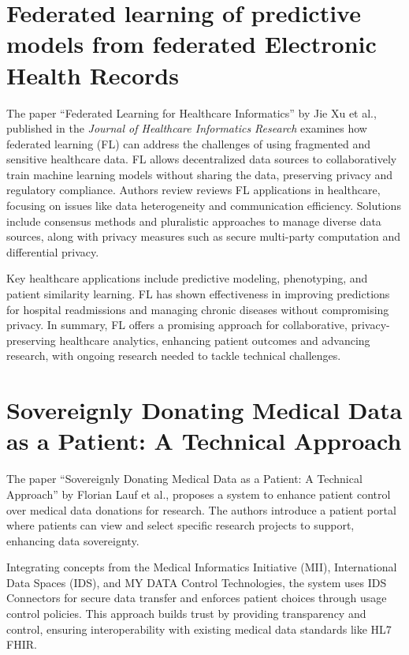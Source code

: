 \section{Federated learning of predictive models from federated Electronic Health Records}\label{sec:federated-learning-of-predictive-models-from-federated-electronic-health-records}

The paper ``Federated Learning for Healthcare Informatics'' by Jie Xu et al., published in the \textit{Journal of Healthcare Informatics Research} examines how federated learning (FL) can address the challenges of using fragmented and sensitive healthcare data\cite{federated_learning_for_healthcare_infromatics}.
FL allows decentralized data sources to collaboratively train machine learning models without sharing the data, preserving privacy and regulatory compliance.
Authors review reviews FL applications in healthcare, focusing on issues like data heterogeneity and communication efficiency.
Solutions include consensus methods and pluralistic approaches to manage diverse data sources, along with privacy measures such as secure multi-party computation and differential privacy.

Key healthcare applications include predictive modeling, phenotyping, and patient similarity learning.
FL has shown effectiveness in improving predictions for hospital readmissions and managing chronic diseases without compromising privacy.
In summary, FL offers a promising approach for collaborative, privacy-preserving healthcare analytics, enhancing patient outcomes and advancing research, with ongoing research needed to tackle technical challenges.

\section{Sovereignly Donating Medical Data as a Patient: A Technical Approach}\label{sec:sovereignly-donating-medical-data-as-a-patient:-a-technical-approach}

The paper ``Sovereignly Donating Medical Data as a Patient: A Technical Approach'' by Florian Lauf et al., proposes a system to enhance patient control over medical data donations for research\cite{sovereignly_donating_medical_data}.
The authors introduce a patient portal where patients can view and select specific research projects to support, enhancing data sovereignty.

Integrating concepts from the Medical Informatics Initiative (MII), International Data Spaces (IDS), and MY DATA Control Technologies, the system uses IDS Connectors for secure data transfer and enforces patient choices through usage control policies.
This approach builds trust by providing transparency and control, ensuring interoperability with existing medical data standards like HL7 FHIR.

